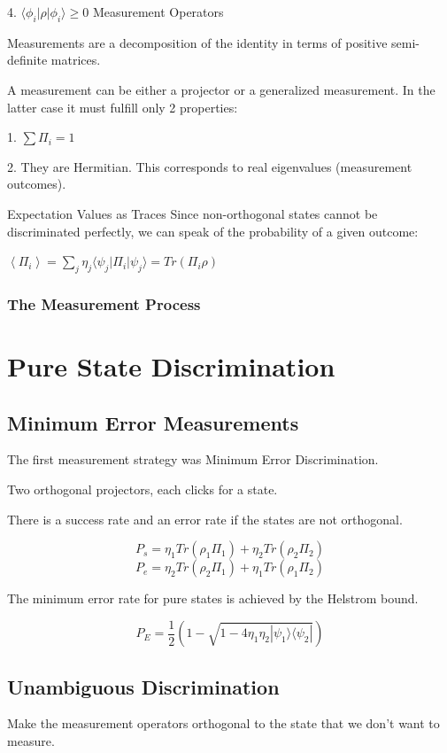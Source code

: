 \documentclass[12pt,oneside,english,reqno]{amsbook}
\numberwithin{section}{chapter}
\numberwithin{equation}{section}
\numberwithin{figure}{section}
\newcommand{\av}[1]{\left\langle #1 \right\rangle}
\newcommand{\br}[1]{\langle #1|}
\newcommand{\ke}[1]{|#1\rangle}
\newcommand{\kb}[2]{\ke{#1}\br{#2}}
\begin{document}
4. $\br {\phi_i} \rho \ke {\phi_i} \geq 0$
{Measurement Operators}

Measurements are a decomposition of the identity in terms of positive semi-definite matrices.

    A measurement can be either a projector or a generalized measurement.  In the latter case it must fulfill only 2 properties:

           1.  $\sum \Pi_i = 1$


	2. They are Hermitian.  This corresponds to real eigenvalues (measurement outcomes).



{Expectation Values as Traces}
Since non-orthogonal states cannot be discriminated perfectly, we can speak of the probability of a given outcome:




	$\av {\Pi_i} = \sum_j \eta_j \br {\psi_j} \Pi_i \ke {\psi_j} = Tr(\Pi_i \rho)$


\subsection{The Measurement Process}

\chapter{Pure State Discrimination}


\section{Minimum Error Measurements}
The first measurement strategy was Minimum Error Discrimination.

	Two orthogonal projectors, each clicks for a state.

	There is a success rate and an error rate if the states are not orthogonal.

\[ P_s =\eta_1 Tr(\rho_1 \Pi_1) + \eta_2Tr(\rho_2 \Pi_2)\]
\[ P_e = \eta_2 Tr(\rho_2 \Pi_1) +\eta_1 Tr(\rho_1 \Pi_2)\]

	The minimum error rate for pure states is achieved by the Helstrom bound.

\[P_E = \frac{1}{2}(1- \sqrt{1-4 \eta_1 \eta_2 \kb{\psi_1}{\psi_2}})\]

\section{Unambiguous Discrimination}
Make the measurement operators orthogonal to the state that we don't want to measure.
\end{document}
